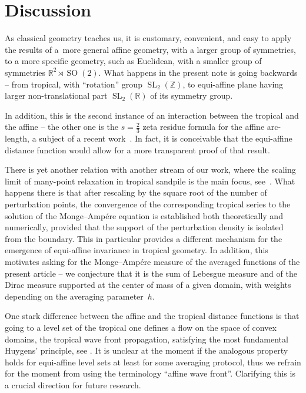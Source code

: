 \documentclass[10pt,a4paper]{amsart}
\numberwithin{equation}{section}
\theoremstyle{definition}
\begin{document}
\section{Discussion}
As classical geometry teaches us, it is customary, convenient, and easy to apply the results of a~more general affine geometry, with a larger group of symmetries, to a more specific geometry, such as Euclidean, with a smaller group of symmetries $\mathbb{R}^2\rtimes \operatorname{SO}(2)$. What happens in the present note is going backwards -- from tropical, with ``rotation'' group $\operatorname{SL}_2(\mathbb{Z})$, to equi-affine plane having larger non-translational part $\operatorname{SL}_2(\mathbb{R})$ of its symmetry group.

In addition, this is the second instance of an interaction between the tropical and the affine -- the other one is the $s=\frac{2}{3}$ zeta  residue formula for the affine arc-length, a subject of a recent work~\cite{us_zeta}. In fact, it is conceivable that the equi-affine distance function would allow for a more transparent proof of that result.

There is yet another relation with another stream of our work, where the scaling limit of many-point relaxation in tropical sandpile is the main focus, see~\cite{KLSS26}. What happens there is that after rescaling by the square root of the number of perturbation points, the convergence of the corresponding tropical series to the solution of the Monge--Amp\'ere equation is established both theoretically and numerically, provided that the support of the perturbation density is isolated from the boundary. This in particular provides a different mechanism for the emergence of equi-affine invariance in tropical geometry. In addition, this motivates asking for the Monge--Amp\'ere measure of the averaged functions of the present article -- we conjecture that it is the sum of Lebesgue measure and of the Dirac measure supported at the center of mass of a given domain, with weights depending on the averaging parameter~$h$.

One stark difference between the affine and the tropical distance functions is that going to a level set of the tropical one defines a flow on the space of convex domains, the tropical wave front propagation, satisfying the most fundamental Huygens' principle, see \cite{mikhalkin2023wave}. It is unclear at the moment if the analogous property holds for equi-affine level sets at least for some averaging protocol, thus we refrain for the moment from using the terminology ``affine wave front''. Clarifying this is a crucial direction for future research.
\end{document}
